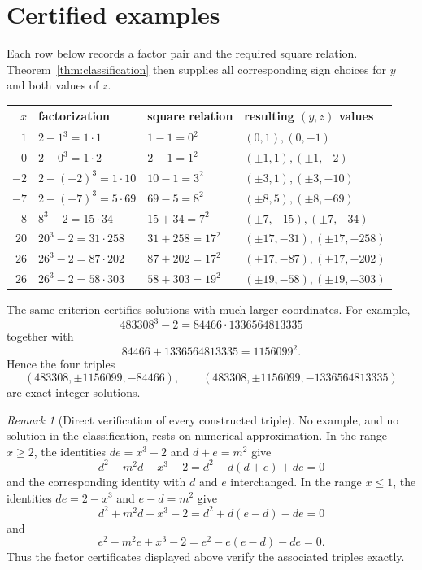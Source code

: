 \documentclass[11pt,a4paper]{amsart}
\theoremstyle{remark}
\newtheorem{remark}[theorem]{Remark}
\begin{document}
\section{Certified examples}

Each row below records a factor pair and the required square relation.  Theorem~\ref{thm:classification} then supplies all corresponding sign choices for $y$ and both values of $z$.

\begin{center}
\small
\begin{tabular}{@{}rlll@{}}
\toprule
$x$ & factorization & square relation & resulting $(y,z)$ values \\
\midrule
$1$  & $2-1^3=1\cdot1$ & $1-1=0^2$
     & $(0,1),(0,-1)$ \\
$0$  & $2-0^3=1\cdot2$ & $2-1=1^2$
     & $(\pm1,1),(\pm1,-2)$ \\
$-2$ & $2-(-2)^3=1\cdot10$ & $10-1=3^2$
     & $(\pm3,1),(\pm3,-10)$ \\
$-7$ & $2-(-7)^3=5\cdot69$ & $69-5=8^2$
     & $(\pm8,5),(\pm8,-69)$ \\
$8$  & $8^3-2=15\cdot34$ & $15+34=7^2$
     & $(\pm7,-15),(\pm7,-34)$ \\
$20$ & $20^3-2=31\cdot258$ & $31+258=17^2$
     & $(\pm17,-31),(\pm17,-258)$ \\
$26$ & $26^3-2=87\cdot202$ & $87+202=17^2$
     & $(\pm17,-87),(\pm17,-202)$ \\
$26$ & $26^3-2=58\cdot303$ & $58+303=19^2$
     & $(\pm19,-58),(\pm19,-303)$ \\
\bottomrule
\end{tabular}
\end{center}

The same criterion certifies solutions with much larger coordinates.  For example,
\[
 483308^3-2
 =84466\cdot1336564813335
\]
together with
\[
 84466+1336564813335=1156099^2.
\]
Hence the four triples
\[
 (483308,\pm1156099,-84466),
 \qquad
 (483308,\pm1156099,-1336564813335)
\]
are exact integer solutions.

\begin{remark}[Direct verification of every constructed triple]
No example, and no solution in the classification, rests on numerical approximation.  In the range $x\geq2$, the identities $de=x^3-2$ and $d+e=m^2$ give
\[
 d^2-m^2d+x^3-2
 =d^2-d(d+e)+de=0
\]
and the corresponding identity with $d$ and $e$ interchanged.  In the range $x\leq1$, the identities $de=2-x^3$ and $e-d=m^2$ give
\[
 d^2+m^2d+x^3-2
 =d^2+d(e-d)-de=0
\]
and
\[
 e^2-m^2e+x^3-2
 =e^2-e(e-d)-de=0.
\]
Thus the factor certificates displayed above verify the associated triples exactly.
\end{remark}
\end{document}
